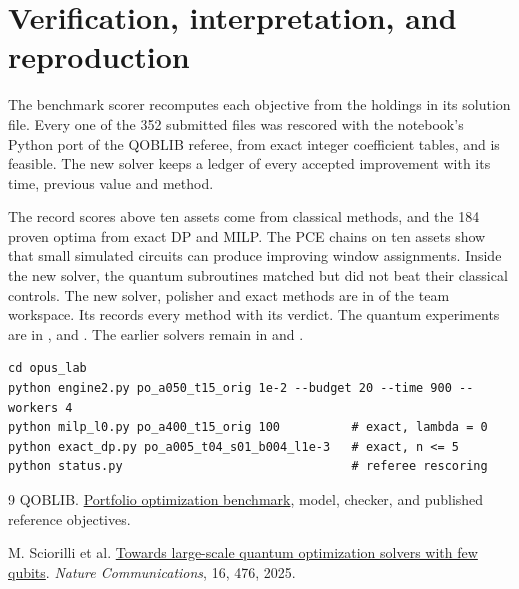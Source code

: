 \documentclass[a4paper]{article}
\begin{document}
\clearpage
\section{Verification, interpretation, and reproduction}

The benchmark scorer recomputes each objective from the holdings in its solution file. Every one of the 352 submitted
files was rescored with the notebook's Python port of the QOBLIB referee, from exact integer coefficient tables, and is feasible.
The new solver keeps a ledger of every accepted improvement with its time, previous value and method.

The record scores above ten assets come from classical methods, and the 184 proven optima from exact DP and MILP.
The PCE chains on ten assets show that small simulated circuits can produce improving window assignments. Inside the new solver, the
quantum subroutines matched but did not beat their classical controls. The new solver, polisher and exact methods are in
 of the team workspace. Its  records every method with its verdict. The
quantum experiments are in ,  and . The earlier solvers remain in
 and .
\begin{verbatim}
cd opus_lab
python engine2.py po_a050_t15_orig 1e-2 --budget 20 --time 900 --workers 4
python milp_l0.py po_a400_t15_orig 100          # exact, lambda = 0
python exact_dp.py po_a005_t04_s01_b004_l1e-3   # exact, n <= 5
python status.py                                # referee rescoring
\end{verbatim}

\begin{thebibliography}{9}
QOBLIB.
\href{https://github.com/ZIB-AOPT/QOBLIB/tree/main/06-portfolio}{Portfolio optimization benchmark},
model, checker, and published reference objectives.

M. Sciorilli et al.
\href{https://doi.org/10.1038/s41467-024-55346-z}{Towards large-scale quantum optimization solvers with few qubits}.
\emph{Nature Communications}, 16, 476, 2025.
\end{thebibliography}
\end{document}
